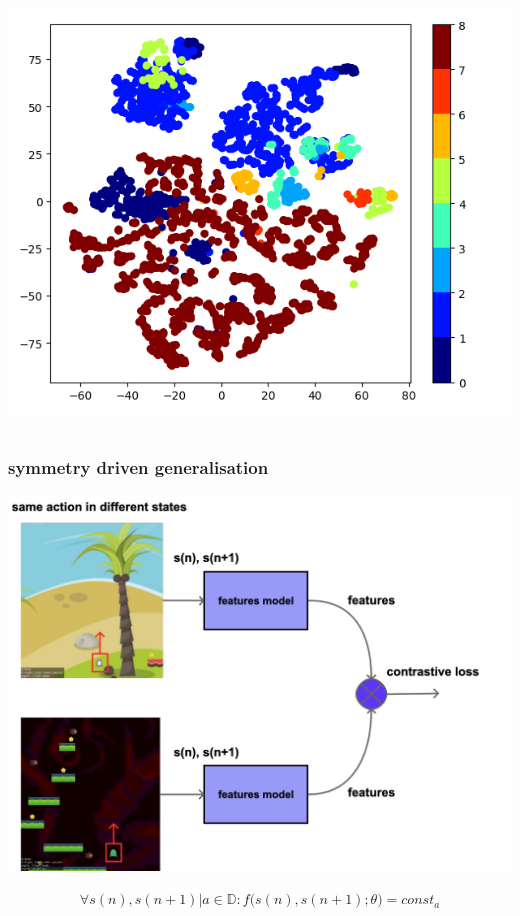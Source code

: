 \documentclass{beamer}
\begin{document}
\begin{frame}
\begin{columns}
    \begin{column}{0.5\textwidth}
      \centering
      \includegraphics[scale=0.3]{../images/rnd_siam_trained.png}
    \end{column}
  
  \end{columns}

\end{frame}

\begin{frame}
  
  \frametitle{symmetry driven generalisation}

  \centering
  \includegraphics[scale=0.15]{../diagrams/symmetry/basic.png}

  \begin{align*}
    \forall s(n),s(n+1) \vert a \in \mathbb{D} : f \Big( s(n), s(n+1); \theta \Big) = const_a 
  \end{align*} 
  
\end{frame}
\end{document}
